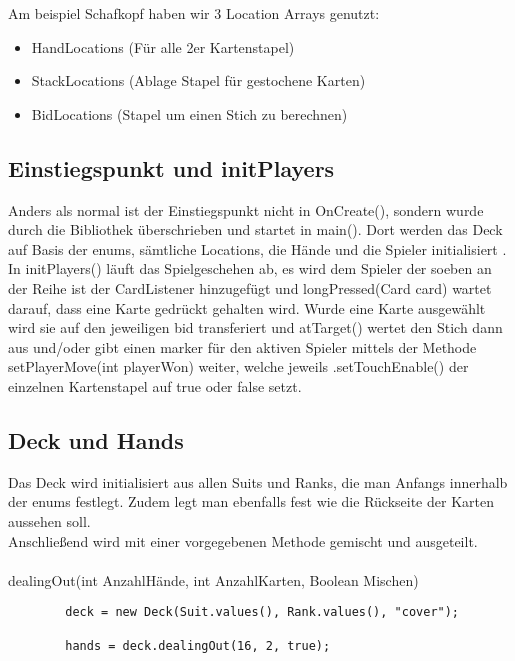 Am beispiel Schafkopf haben wir 3 Location Arrays genutzt:\\
\begin{itemize}
\item HandLocations (Für alle 2er Kartenstapel)
\item StackLocations (Ablage Stapel für gestochene Karten)
\item BidLocations (Stapel um einen Stich zu berechnen)
\end{itemize}

\subsection{Einstiegspunkt und initPlayers}
Anders als normal ist der Einstiegspunkt nicht in OnCreate(), sondern wurde durch die Bibliothek überschrieben und startet in main(). Dort werden das Deck auf Basis der enums, sämtliche Locations, die Hände und die Spieler initialisiert . In initPlayers() läuft das Spielgeschehen ab, es wird dem Spieler der soeben an der Reihe ist der CardListener hinzugefügt und longPressed(Card card) wartet darauf, dass eine Karte gedrückt gehalten wird. Wurde eine Karte ausgewählt wird sie auf den jeweiligen bid transferiert und atTarget() wertet den Stich dann aus und/oder gibt einen marker für den aktiven Spieler mittels der Methode setPlayerMove(int playerWon) weiter, welche jeweils .setTouchEnable() der einzelnen Kartenstapel auf true oder false setzt.\\



\subsection{Deck und Hands}
Das Deck wird initialisiert aus allen Suits und Ranks, die man Anfangs innerhalb der enums festlegt. Zudem legt man ebenfalls fest wie die Rückseite der Karten aussehen soll. \\
Anschließend wird mit einer vorgegebenen Methode gemischt und ausgeteilt.\\
\\
dealingOut(int AnzahlHände, int AnzahlKarten, Boolean Mischen)
     
     
      \begin{lstlisting}   
        deck = new Deck(Suit.values(), Rank.values(), "cover");
        
        hands = deck.dealingOut(16, 2, true);
	\end{lstlisting}

